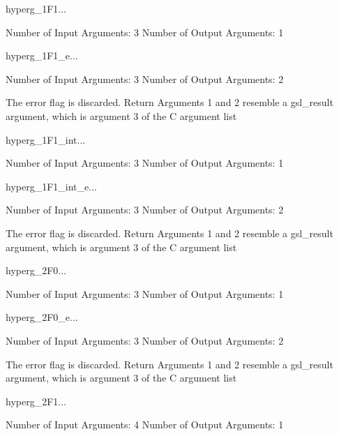 \begin{funcdesc}{hyperg_1F1}{...}

    Number of Input  Arguments:  3
    Number of Output Arguments:  1
\end{funcdesc}

\begin{funcdesc}{hyperg_1F1_e}{...}

    Number of Input  Arguments:  3
    Number of Output Arguments:  2

The error flag is discarded.
Return Arguments 1 and 2 resemble a gsl_result argument,
	which is  argument 3 of the C argument list

\end{funcdesc}

\begin{funcdesc}{hyperg_1F1_int}{...}

    Number of Input  Arguments:  3
    Number of Output Arguments:  1
\end{funcdesc}

\begin{funcdesc}{hyperg_1F1_int_e}{...}

    Number of Input  Arguments:  3
    Number of Output Arguments:  2

The error flag is discarded.
Return Arguments 1 and 2 resemble a gsl_result argument,
	which is  argument 3 of the C argument list

\end{funcdesc}

\begin{funcdesc}{hyperg_2F0}{...}

    Number of Input  Arguments:  3
    Number of Output Arguments:  1
\end{funcdesc}

\begin{funcdesc}{hyperg_2F0_e}{...}

    Number of Input  Arguments:  3
    Number of Output Arguments:  2

The error flag is discarded.
Return Arguments 1 and 2 resemble a gsl_result argument,
	which is  argument 3 of the C argument list

\end{funcdesc}

\begin{funcdesc}{hyperg_2F1}{...}

    Number of Input  Arguments:  4
    Number of Output Arguments:  1
\end{funcdesc}

